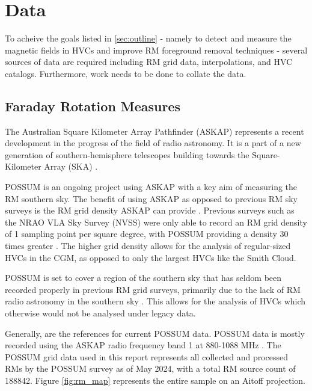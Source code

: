 \chapter{Data}
\label{cha:data}

To acheive the goals listed in \ref{sec:outline} - namely to detect and measure the magnetic fields in HVCs and improve RM foreground removal techniques - several sources of data are required including RM grid data, interpolations, and HVC catalogs. Furthermore, work needs to be done to collate the data.

\section{Faraday Rotation Measures}
\label{sec:ASKAP}

The Australian Square Kilometer Array Pathfinder (ASKAP) represents a recent development in the progress of the field of radio astronomy. It is a part of a new generation of southern-hemisphere telescopes building towards the Square-Kilometer Array (SKA) \citep{ID61, ID52, ID71}.


POSSUM is an ongoing project using ASKAP with a key aim of measuring the RM southern sky. The benefit of using ASKAP as opposed to previous RM sky surveys is the RM grid density ASKAP can provide \citep{ID52, ID71, ID61}. Previous surveys such as the NRAO VLA Sky Survey (NVSS) were only able to record an RM grid density of 1 sampling point per square degree, with POSSUM providing a density 30 times greater \citep{ID1, ID52, ID71, ID61, ID18}. The higher grid density allows for the analysis of regular-sized HVCs in the CGM, as opposed to only the largest HVCs like the Smith Cloud.


POSSUM is set to cover a region of the southern sky that has seldom been recorded properly in previous RM grid surveys, primarily due to the lack of RM radio astronomy in the southern sky \citep{ID44, ID45, ID52, ID71}. This allows for the analysis of HVCs which otherwise would not be analysed under legacy data.


Generally, \cite{ID52, ID71} are the references for current POSSUM data. POSSUM data is mostly recorded using the ASKAP radio frequency band 1 at 880-1088 MHz \citep{ID1, ID52, ID71}. The POSSUM grid data used in this report represents all collected and processed RMs by the POSSUM survey as of May 2024, with a total RM source count of 188842. Figure \ref{fig:rm_map} represents the entire sample on an Aitoff projection.

